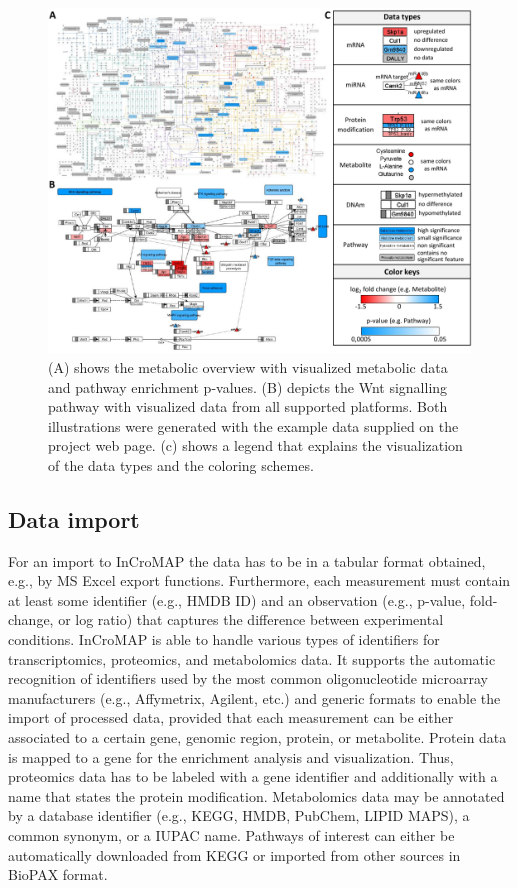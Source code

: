 \documentclass[final,5p,times,twocolumn]{elsarticle}
\begin{document}
\begin{figure}[t]
\center
\includegraphics[width=1.0\textwidth]{InCroMAP_examples.pdf}
\caption{(A) shows the metabolic overview with visualized metabolic data and pathway enrichment p-values. (B) depicts the Wnt signalling pathway with visualized data from all supported platforms. Both illustrations were generated with the example data supplied on the project web page. (c) shows a legend that explains the visualization of the data types and the coloring schemes.}
\label{fig:incromap-examples}
\end{figure}

\subsection{Data import}
For an import to InCroMAP the data has to be in a tabular format obtained, e.g., by MS Excel export functions. Furthermore, each measurement must contain at least some identifier (e.g., HMDB ID) and an observation (e.g., p-value, fold-change, or log ratio) that captures the difference between experimental conditions. InCroMAP is able to handle various types of identifiers for transcriptomics, proteomics, and metabolomics data. It supports the automatic recognition of identifiers used by the most common oligonucleotide microarray manufacturers (e.g., Affymetrix, Agilent, etc.) and generic formats to enable the import of processed data, provided that each measurement can be either associated to a certain gene, genomic region, protein, or metabolite. Protein data is mapped to a gene for the enrichment analysis and visualization. Thus, proteomics data has to be labeled with a gene identifier and additionally with a name that states the protein modification. Metabolomics data may be annotated by a database identifier (e.g., KEGG, HMDB, PubChem, LIPID MAPS), a common synonym, or a IUPAC name. Pathways of interest can either be automatically downloaded from KEGG or imported from other sources in BioPAX format.
\end{document}
